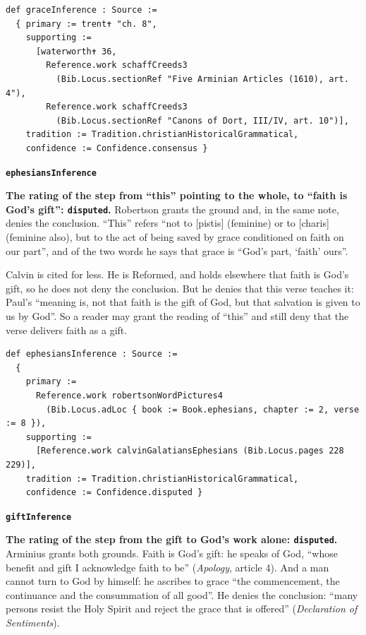 \documentclass[11pt]{article}
\begin{document}
{\small\begin{verbatim}
def graceInference : Source :=
  { primary := trent✝ "ch. 8",
    supporting :=
      [waterworth✝ 36,
        Reference.work schaffCreeds3
          (Bib.Locus.sectionRef "Five Arminian Articles (1610), art. 4"),
        Reference.work schaffCreeds3
          (Bib.Locus.sectionRef "Canons of Dort, III/IV, art. 10")],
    tradition := Tradition.christianHistoricalGrammatical,
    confidence := Confidence.consensus }
\end{verbatim}}
\par\medskip\noindent\textbf{\texttt{ephesians\allowbreak{}Inference}}\par\nobreak\noindent
\textbf{The rating of the step from “this” pointing to the whole, to “faith is God’s gift”: \texttt{disputed}.} Robertson grants the ground and, in the same note, denies the conclusion. “This” refers “not to [pistis] (feminine) or to [charis] (feminine also), but to the act of being saved by grace conditioned on faith on our part”, and of the two words he says that grace is “God’s part, ‘faith’ ours”.

Calvin is cited for less. He is Reformed, and holds elsewhere that faith is God’s gift, so he does not deny the conclusion. But he denies that this verse teaches it: Paul’s “meaning is, not that faith is the gift of God, but that salvation is given to us by God”. So a reader may grant the reading of “this” and still deny that the verse delivers faith as a gift.

{\small\begin{verbatim}
def ephesiansInference : Source :=
  {
    primary :=
      Reference.work robertsonWordPictures4
        (Bib.Locus.adLoc { book := Book.ephesians, chapter := 2, verse := 8 }),
    supporting :=
      [Reference.work calvinGalatiansEphesians (Bib.Locus.pages 228 229)],
    tradition := Tradition.christianHistoricalGrammatical,
    confidence := Confidence.disputed }
\end{verbatim}}
\par\medskip\noindent\textbf{\texttt{gift\allowbreak{}Inference}}\par\nobreak\noindent
\textbf{The rating of the step from the gift to God’s work alone: \texttt{disputed}.} Arminius grants both grounds. Faith is God’s gift: he speaks of God, “whose benefit and gift I acknowledge faith to be” (\emph{Apology}, article 4). And a man cannot turn to God by himself: he ascribes to grace “the commencement, the continuance and the consummation of all good”. He denies the conclusion: “many persons resist the Holy Spirit and reject the grace that is offered” (\emph{Declaration of Sentiments}).
\end{document}
